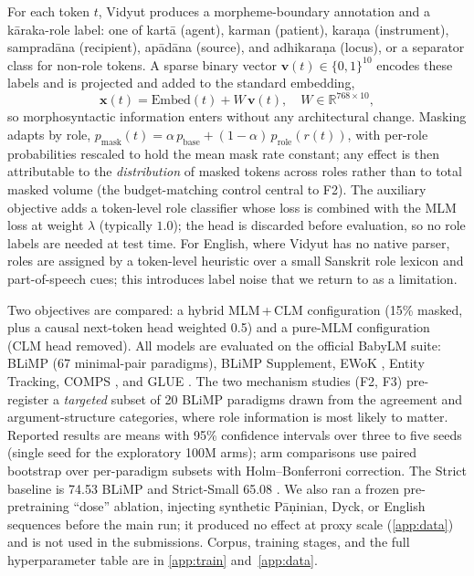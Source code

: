 \documentclass[11pt]{article}
\begin{document}
For each token $t$, Vidyut \cite{Prasad2024Vidyut} produces a morpheme-boundary annotation and a k\=araka-role label: one of kart\=a (agent), karman (patient), kara\d{n}a (instrument), samprad\=ana (recipient), ap\=ad\=ana (source), and adhikara\d{n}a (locus), or a separator class for non-role tokens. A sparse binary vector $\mathbf{v}(t)\in\{0,1\}^{10}$ encodes these labels and is projected and added to the standard embedding,
\begin{equation}
\mathbf{x}(t) = \mathrm{Embed}(t) + W\,\mathbf{v}(t),\quad W\in\mathbb{R}^{768\times10},
\end{equation}
so morphosyntactic information enters without any architectural change. Masking adapts by role, $p_{\text{mask}}(t) = \alpha\,p_{\text{base}} + (1-\alpha)\,p_{\text{role}}(r(t))$, with per-role probabilities rescaled to hold the mean mask rate constant; any effect is then attributable to the \emph{distribution} of masked tokens across roles rather than to total masked volume (the budget-matching control central to F2). The auxiliary objective adds a token-level role classifier whose loss is combined with the MLM loss at weight $\lambda$ (typically $1.0$); the head is discarded before evaluation, so no role labels are needed at test time. For English, where Vidyut has no native parser, roles are assigned by a token-level heuristic over a small Sanskrit role lexicon and part-of-speech cues; this introduces label noise that we return to as a limitation.

Two objectives are compared: a hybrid MLM\,+\,CLM configuration (15\% masked, plus a causal next-token head weighted 0.5) and a pure-MLM configuration (CLM head removed). All models are evaluated on the official BabyLM suite: BLiMP \cite{Warstadt2020BLiMP} (67 minimal-pair paradigms), BLiMP Supplement, EWoK \cite{Ivanova2024EWoK}, Entity Tracking, COMPS \cite{Misra2023COMPS}, and GLUE \cite{Wang2019GLUE}. The two mechanism studies (F2, F3) pre-register a \emph{targeted} subset of 20 BLiMP paradigms drawn from the agreement and argument-structure categories, where role information is most likely to matter. Reported results are means with 95\% confidence intervals over three to five seeds (single seed for the exploratory 100M arms); arm comparisons use paired bootstrap over per-paradigm subsets with Holm--Bonferroni correction. The Strict baseline is 74.53 BLiMP and Strict-Small 65.08 \cite{Hu2024BabyLM}. We also ran a frozen pre-pretraining ``dose'' ablation, injecting synthetic P\=a\d{n}inian, Dyck, or English sequences before the main run; it produced no effect at proxy scale (\ref{app:data}) and is not used in the submissions. Corpus, training stages, and the full hyperparameter table are in \ref{app:train} and~\ref{app:data}.
\end{document}
